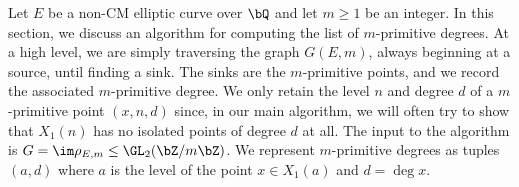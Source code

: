 \documentclass[11pt,reqno]{amsart}
\theoremstyle{plain}
\theoremstyle{definition}
\newcommand{\Q}{\bQ}
\newcommand{\Z}{\bZ}
\newcommand{\abbey}[1]{\textcolor{blue}{Abbey: #1}}
\newcommand{\abedit}[1]{{\color{blue} #1}}
\begin{document}
Let $E$ be a non-CM elliptic curve over $\Q$ and let $m\geq1$ be an integer. In this section, we discuss an algorithm for computing the list  of $m$-primitive degrees. At a high level, we are simply traversing the graph $G(E,m)$, always beginning at a source, until finding a sink. The sinks are the $m$-primitive points, and we record the associated $m$-primitive degree. We only retain the level $n$ and degree $d$ of a $m$-primitive point $(x,n,d)$ since, in our main algorithm, we will often try to show that $X_1(n)$ has no isolated points of degree $d$ at all. The input to the algorithm is $G=\im \rho_{E,m}\leq \GL_2(\Z/m\Z)$. We represent $m$-primitive degrees as tuples $( a,d)$ where $a$ is the level of the point $x\in X_1(a)$ and $d=\deg x$.

\end{document}
